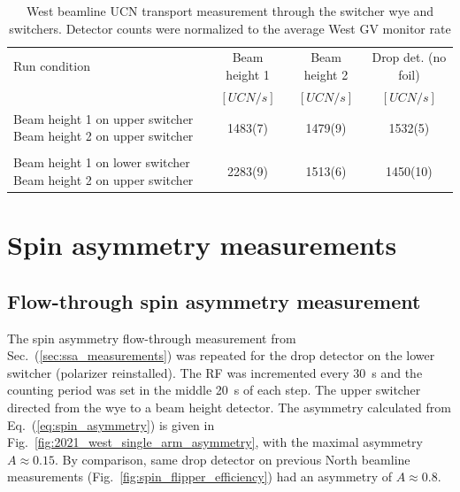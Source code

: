 \begin{table}
    \centering
    \caption{West beamline UCN transport measurement through the switcher wye and switchers. Detector counts were normalized to the average West GV monitor rate}\label{tb:2021_transport}
    \begin{tabular}{
        p{2in} 
        c
        c
        c
    }
    \toprule
        {Run condition} & {Beam height 1} & {Beam height 2} &{Drop det. (no foil)} \\
        & {$[\unit{UCN\per s}]$} & {$[\unit{UCN\per s}]$} & {$[\unit{UCN\per s}]$}\\
    \midrule
        {\small Beam height 1 on upper switcher Beam height 2 on upper switcher} &  1483(7) & 1479(9) & 1532(5)\\
        \\
        {\small Beam height 1 on lower switcher Beam height 2 on upper switcher} &  2283(9) & 1513(6) & 1450(10)\\
    \bottomrule
    \end{tabular}
\end{table}


\section{Spin asymmetry measurements}\label{sec:asymmetry_west_2021}



\subsection{Flow-through spin asymmetry measurement}\label{sec:single_arm_flow_through_west_2021}


The spin asymmetry flow-through measurement from Sec.~(\ref{sec:ssa_measurements}) was repeated for the drop detector on the lower switcher (polarizer reinstalled). The RF was incremented every \qty{30}{s} and the counting period was set in the middle \qty{20}{s} of each step.  The upper switcher directed \ucn from the wye to a beam height detector. The asymmetry calculated from Eq.~(\ref{eq:spin_asymmetry}) is given in Fig.~\ref{fig:2021_west_single_arm_asymmetry}, with the maximal asymmetry $A\approx 0.15$. By comparison, same drop detector on previous North beamline measurements (Fig.~\ref{fig:spin_flipper_efficiency}) had an asymmetry of $A\approx 0.8$.

